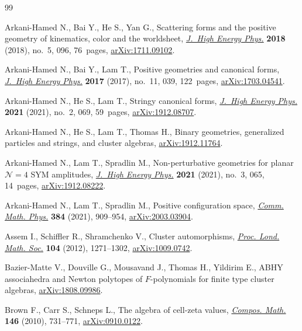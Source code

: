 \documentclass[pdftex]{sigma}%
\numberwithin{equation}{section}
\begin{document}
\begin{thebibliography}{99}
\footnotesize\itemsep=0pt

Arkani-Hamed N., Bai Y., He S., Yan G., Scattering forms and the positive
 geometry of kinematics, color and the worldsheet, \href{https://doi.org/10.1007/jhep05(2018)096}{\textit{J.~High Energy
 Phys.}} \textbf{2018} (2018), no.~5, 096, 76~pages, \href{https://arxiv.org/abs/1711.09102}{arXiv:1711.09102}.

Arkani-Hamed N., Bai Y., Lam T., Positive geometries and canonical forms,
 \href{https://doi.org/10.1007/jhep11(2017)039}{\textit{J.~High Energy Phys.}} \textbf{2017} (2017), no.~11, 039, 122~pages,
 \href{https://arxiv.org/abs/1703.04541}{arXiv:1703.04541}.

Arkani-Hamed N., He S., Lam T., Stringy canonical forms, \href{https://doi.org/10.1007/jhep02(2021)069}{\textit{J.~High Energy
 Phys.}} \textbf{2021} (2021), no.~2, 069, 59~pages, \href{https://arxiv.org/abs/1912.08707}{arXiv:1912.08707}.

Arkani-Hamed N., He S., Lam T., Thomas H., Binary geometries, generalized
 particles and strings, and cluster algebras, \href{https://arxiv.org/abs/1912.11764}{arXiv:1912.11764}.

Arkani-Hamed N., Lam T., Spradlin M., Non-perturbative geometries for planar
 {${\mathcal N} = 4$} {SYM} amplitudes, \href{https://doi.org/10.1007/jhep03(2021)065}{\textit{J.~High Energy Phys.}}
 \textbf{2021} (2021), no.~3, 065, 14~pages, \href{https://arxiv.org/abs/1912.08222}{arXiv:1912.08222}.

Arkani-Hamed N., Lam T., Spradlin M., Positive configuration space,
 \href{https://doi.org/10.1007/s00220-021-04041-x}{\textit{Comm. Math. Phys.}} \textbf{384} (2021), 909--954,
 \href{https://arxiv.org/abs/2003.03904}{arXiv:2003.03904}.

Assem I., Schiffler R., Shramchenko V., Cluster automorphisms, \href{https://doi.org/10.1112/plms/pdr049}{\textit{Proc.
 Lond. Math. Soc.}} \textbf{104} (2012), 1271--1302, \href{https://arxiv.org/abs/1009.0742}{arXiv:1009.0742}.

Bazier-Matte V., Douville G., Mousavand J., Thomas H., Yildirim E., {ABHY}
 associahedra and {N}ewton polytopes of {$F$}-polynomials for finite type
 cluster algebras, \href{https://arxiv.org/abs/1808.09986}{arXiv:1808.09986}.

Brown F., Carr S., Schneps L., The algebra of cell-zeta values, \href{https://doi.org/10.1112/S0010437X09004540}{\textit{Compos.
 Math.}} \textbf{146} (2010), 731--771, \href{https://arxiv.org/abs/0910.0122}{arXiv:0910.0122}.


\end{thebibliography}
\end{document}
